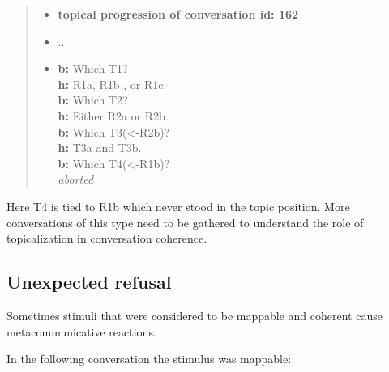     \newcommand{\topicannot}[3]{
        \textbf{#1} #2 \\
    }

    \begin{quote}
    \begin{itemize}[label={}, leftmargin=0pt, itemsep=0.5em]
    \item \textbf{topical progression of conversation id: 162}
    \item ...
    \item \topicannot{b:}{Which T1?}
    \item \topicannot{h:}{R1a, R1b , or R1c.}
    \item \topicannot{b:}{Which T2?}
    \item \topicannot{h:}{Either R2a or R2b.}
    \item \topicannot{b:}{Which T3(<-R2b)?}
    \item \topicannot{h:}{T3a and T3b.}
    \item \topicannot{b:}{Which T4(<-R1b)?}
    \item \textit{aborted}
    \end{itemize}
    \end{quote}

    Here T4 is tied to R1b which never stood in the topic position.
    More conversations of this type  need to be gathered
    to understand the role of topicalization in conversation coherence.

\subsection{Unexpected refusal}

Sometimes stimuli that were considered to be mappable and coherent
cause metacommunicative reactions.

In the following conversation the stimulus was mappable:

